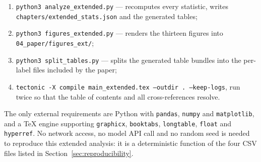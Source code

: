 {\sloppy
\begin{enumerate}
  \item \texttt{python3 analyze\_extended.py} --- recomputes every statistic, writes
        \texttt{chapters/extended\_stats.json} and the generated tables;
  \item \texttt{python3 figures\_extended.py} --- renders the thirteen figures into
        \texttt{04\_paper/figures\_ext/};
  \item \texttt{python3 split\_tables.py} --- splits the generated table bundles into the
        per-label files included by the paper;
  \item \texttt{tectonic -X compile main\_extended.tex --outdir . --keep-logs}, run twice so
        that the table of contents and all cross-references resolve.
\end{enumerate}
}

The only external requirements are Python with \texttt{pandas}, \texttt{numpy} and
\texttt{matplotlib}, and a TeX engine supporting \texttt{graphicx}, \texttt{booktabs},
\texttt{longtable}, \texttt{float} and \texttt{hyperref}. No network access, no model API
call and no random seed is needed to reproduce this extended analysis: it is a deterministic
function of the four CSV files listed in Section~\ref{sec:reproducibility}.

